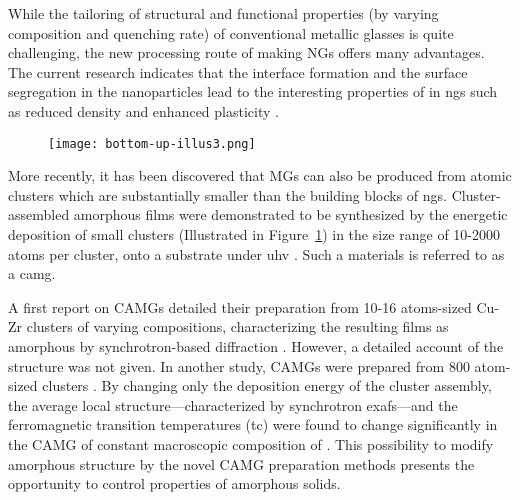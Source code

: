 While the tailoring of structural and functional properties (by varying composition and quenching rate) of conventional metallic glasses is quite challenging, the new processing route of making NGs offers many advantages. The current research indicates that the interface formation and the surface segregation in the nanoparticles lead to the interesting properties of in \gls{ng}s such as reduced density and enhanced plasticity \cite{Adjaoud2016,Adjaoud2018,Ritter2011,Nandam2017,Wang2017,Wang2018,Nandam2020,Nandam2021}.  \par

\begin{figure}[!ht] \centering
	\texttt{[image: bottom-up-illus3.png]}
	\label{f:bottom-up}
\end{figure}

More recently, it has been discovered that MGs can also be produced from atomic clusters which are substantially smaller than the building blocks of \gls{ng}s. Cluster-assembled amorphous films were demonstrated to be synthesized by the energetic deposition of small clusters (Illustrated in Figure~\ref{f:bottom-up}) in the size range of 10-2000 atoms per cluster, onto a substrate under \gls{uhv} \cite{Kartouzian2013,Kartouzian2014,Benel2019}. Such a materials is referred to as a \gls{camg}. \par 

A first report on CAMGs detailed their preparation from 10-16 atoms-sized Cu-Zr clusters of varying compositions, characterizing the resulting films as amorphous by synchrotron-based diffraction \cite{Kartouzian2013,Kartouzian2014}. However, a detailed account of the structure was not given. In another study, \fs CAMGs were prepared from 800 atom-sized clusters \cite{Benel2019,Benel2018}. By changing only the deposition energy of the cluster assembly, the average local structure---characterized by synchrotron \gls{exafs}---and the ferromagnetic transition temperatures (\gls{tc}) were found to change significantly in the CAMG of constant macroscopic composition of \fs. This possibility to modify amorphous structure by the novel CAMG preparation methods presents the opportunity to control properties of amorphous solids. \par

